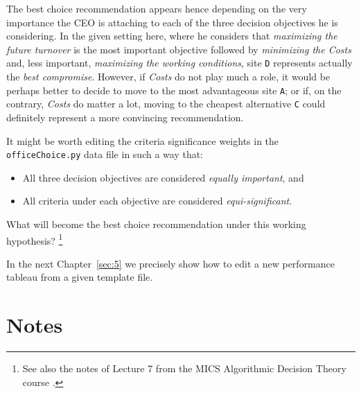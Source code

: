 The best choice recommendation appears hence depending on the very importance the CEO is attaching to each of the three decision objectives he is considering. In the given setting here, where he considers that \emph{maximizing the future turnover} is the most important objective followed by \emph{minimizing the Costs} and, less important, \emph{maximizing the working conditions}, site \texttt{D} represents actually the \emph{best compromise}. However, if \emph{Costs} do not play much a role, it would be perhaps better to decide to move to the most advantageous site \texttt{A}; or if, on the contrary, \emph{Costs} do matter a lot, moving to the cheapest alternative \texttt{C} could definitely represent a more convincing recommendation. 

It might be worth editing the criteria significance weights in the\\
\texttt{officeChoice.py} data file in such a way that:
\begin{itemize}
\item All three decision objectives are considered \emph{equally important}, and
\item All criteria under each objective are considered \emph{equi-significant}.
\end{itemize}
What will become the best choice recommendation under this working hypothesis? \footnote{See also the notes of Lecture 7 from the MICS Algorithmic Decision Theory course \citep{ADT-L7}.} 

\vspace{1cm}

In the next Chapter~\ref{sec:5} we precisely show how to edit a new performance tableau from a given template file. 

{}
\section*{Notes}

